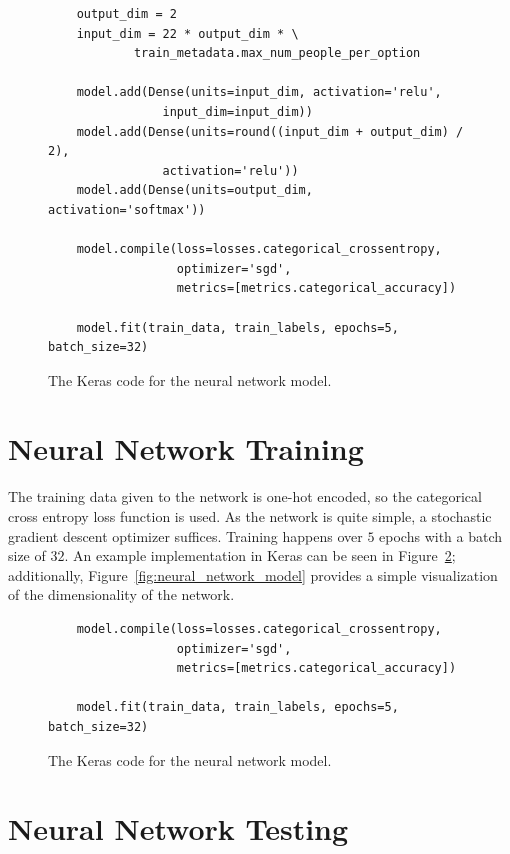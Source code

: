 \documentclass{report}
\begin{document}
\begin{figure}[h]
    \centering
    \begin{verbatim}
    output_dim = 2
    input_dim = 22 * output_dim * \
            train_metadata.max_num_people_per_option

    model.add(Dense(units=input_dim, activation='relu',
                input_dim=input_dim))
    model.add(Dense(units=round((input_dim + output_dim) / 2),
                activation='relu'))
    model.add(Dense(units=output_dim, activation='softmax'))

    model.compile(loss=losses.categorical_crossentropy,
                  optimizer='sgd',
                  metrics=[metrics.categorical_accuracy])
    
    model.fit(train_data, train_labels, epochs=5, batch_size=32)
    \end{verbatim}
    \caption{The Keras code for the neural network model.}
    \label{fig:code_for_model}
\end{figure}

\FloatBarrier
\section{Neural Network Training}

The training data given to the network is one-hot encoded, so the categorical cross entropy loss
function is used. As the network is quite simple, a stochastic gradient descent optimizer suffices.
Training happens over $5$ epochs with a batch size of $32$. An example implementation in Keras can
be seen in Figure~\ref{fig:code_for_training}; additionally, Figure~\ref{fig:neural_network_model}
provides a simple visualization of the dimensionality of the network.

\begin{figure}[h]
    \centering
    \begin{verbatim}
    model.compile(loss=losses.categorical_crossentropy,
                  optimizer='sgd',
                  metrics=[metrics.categorical_accuracy])
    
    model.fit(train_data, train_labels, epochs=5, batch_size=32)
    \end{verbatim}
    \caption{The Keras code for the neural network model.}
    \label{fig:code_for_training}
\end{figure}

\FloatBarrier
\section{Neural Network Testing}
\end{document}
